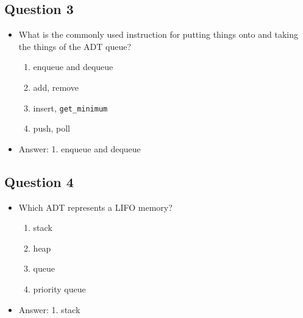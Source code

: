\begin{slide}
\section[-1]{Question 3}

\begin{PauseHighLight}
  \begin{itemize}
  \item What is the commonly used instruction for putting things onto and taking the things of the ADT queue?
    \begin{enumerate}
    \item enqueue and dequeue
    \item add, remove
    \item insert, \verb+get_minimum+
    \item push, poll\pause
    \end{enumerate}
  \item Answer: 1. enqueue and dequeue\pauseb
  \end{itemize}
\end{PauseHighLight}
\end{slide}

\begin{slide}
\section[-1]{Question 4}

\begin{PauseHighLight}
  \begin{itemize}
  \item Which ADT represents a LIFO memory?
    \begin{enumerate}
    \item stack
    \item heap
    \item queue
    \item priority queue\pause
    \end{enumerate}
  \item Answer: 1. stack\pauseb
  \end{itemize}
\end{PauseHighLight}
\end{slide}

